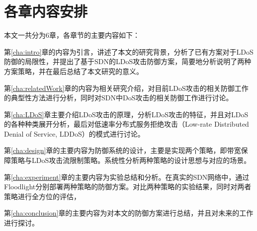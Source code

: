 \section{各章内容安排}
\label{sec:arrange}
本文一共分为6章，各章节的主要内容如下：

第\ref{cha:intro}章的内容为引言，讲述了本文的研究背景，分析了已有方案对于LDoS防御的局限性，并提出了基于SDN的LDoS攻击防御方案，简要地分析说明了两种方案策略，并在最后总结了本文研究的意义。

第\ref{cha:relatedWork}章的内容为相关研究介绍，对目前LDoS攻击的相关防御工作的典型性方法进行分析，同时对SDN中DoS攻击的相关防御工作进行讨论。

第\ref{cha:LDoS}章主要介绍LDoS攻击的原理，分析LDoS攻击的特征，并且对LDoS的各种种类展开分析，最后对低速率分布式服务拒绝攻击（Low-rate Distributed Denial of Service, LDDoS）的模式进行讨论。

第\ref{cha:design}章的主要内容为防御系统的设计，主要是实现两个策略，即带宽保障策略与LDoS攻击流限制策略。系统性分析两种策略的设计思想与对应的场景。

第\ref{cha:experiment}章的主要内容为实验总结和分析。在真实的SDN网络中，通过Floodlight分别部署两种策略的防御方案。对比两种策略的实验结果，同时对两者策略进行全方位的评估，

第\ref{cha:conclusion}章的主要内容为对本文的防御方案进行总结，并且对未来的工作进行探讨。
